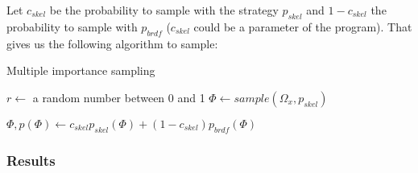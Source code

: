 Let $c_{skel}$ be the probability to sample with the strategy $p_{skel}$ and $1 - c_{skel}$ the probability to sample with $p_{brdf}$ ($c_{skel}$ could be a parameter of the program). That gives us the following algorithm to sample:

\begin{algorithm}[h!]
\label{algo::MIS}
\caption[MIS]{Multiple importance sampling}
$r \gets$ a random number between 0 and 1\;
 {
	\Return $\Phi \gets sample(\Omega_x, p_{skel})$
} 

\Return $\Phi, p(\Phi) \gets c_{skel} p_{skel}(\Phi) + (1 - c_{skel}) p_{brdf}(\Phi)$
\end{algorithm}

\subsubsection{Results}

